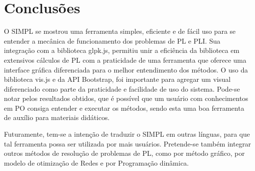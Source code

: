 \documentclass [11pt]{articleSBPO}
\begin{document}
\section{Conclusões}\label{sec:conclusao}
O SIMPL se mostrou uma ferramenta simples, eficiente e de fácil uso para se entender a mecânica de funcionamento dos problemas de PL e PLI. Sua integração com a biblioteca glpk.js, permitiu unir a eficiência da biblioteca em extensivos cálculos de PL com a praticidade de uma ferramenta que oferece uma interface gráfica diferenciada para o melhor entendimento dos métodos. O uso da biblioteca vis.js e da API Bootstrap, foi importante para agregar um visual diferenciado como parte da praticidade e facilidade de uso do sistema. Pode-se notar pelos resultados obtidos, que é possível que um usuário com conhecimentos em PO consiga entender e executar os métodos, sendo esta uma boa ferramenta de auxílio para materiais didáticos.

Futuramente, tem-se a intenção de traduzir o SIMPL em outras línguas, para que tal ferramenta possa ser utilizada por mais usuários. Pretende-se também integrar outros métodos de resolução de problemas de PL, como por método gráfico, por modelo de otimização de Redes e por Programação dinâmica.


\end{document}
